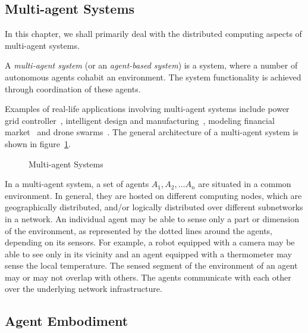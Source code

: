 \noindent

\subsection{Multi-agent Systems}
\label{sec:agents:mas}

In this chapter, we shall primarily deal with the distributed computing aspects of multi-agent systems.  

\begin{definition} 
	A {\em multi-agent system} (or an {\em agent-based system}) is a system, where a number of autonomous agents cohabit an 
	environment. The system functionality is achieved through coordination of these agents. 
\end{definition}

\noindent
Examples of real-life applications involving multi-agent systems include power grid controller~\citep{Kantamneni:2015}, intelligent 
design and manufacturing~\citep{Shen:2001}, modeling financial market~\citep{Samanidou:2007} and drone 
swarms~\citep{Shrit:2017,Lomonaco:2018}. 
%
The general architecture of a multi-agent system is shown in figure~\ref{fig:agents:mas}.

\begin{figure}
	\centering
	\caption{Multi-agent Systems}
	\label{fig:agents:mas}
\end{figure}

In a multi-agent system, a set of agents $A_1, A_2, \dots A_n$ are situated in a common environment. In general, they are hosted
on different computing nodes, which are geographically distributed, and/or logically distributed over different subnetworks in a
network. An individual agent may be able to sense only a part or dimension of the environment, as represented by the dotted lines 
around the agents, depending on its sensors. For example, a robot equipped with a camera may be able to see only in its vicinity 
and an agent equipped with a thermometer may sense the local temperature. The sensed segment of the environment of an agent may or 
may not overlap with others. The agents communicate with each other over the underlying network infrastructure. 

\subsection{Agent Embodiment}

